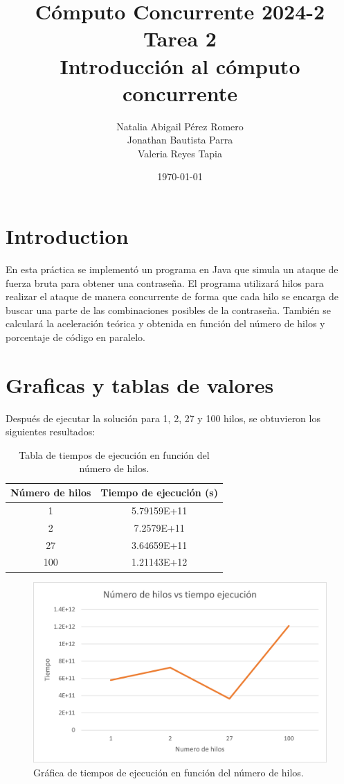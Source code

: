 \documentclass{article}
\title{Cómputo Concurrente 2024-2 \\ Tarea 2 \\ Introducción al cómputo concurrente}
\author{Natalia Abigail Pérez Romero\\
Jonathan Bautista Parra \\ Valeria Reyes Tapia}
\date{\today}
\begin{document}
\maketitle
\section{Introduction}
En esta práctica se implementó un programa en Java que simula un ataque de fuerza bruta para obtener una contraseña. El programa utilizará hilos para realizar el ataque de manera concurrente de forma que cada hilo se encarga de buscar una parte de las combinaciones posibles de la contraseña. También se calculará la aceleración teórica y obtenida en función del número de hilos y porcentaje de código en paralelo.

\section{Graficas y tablas de valores}

Después de ejecutar la solución para 1, 2, 27 y 100 hilos, se obtuvieron los siguientes resultados:

\begin{table}[h]
    \centering
        \begin{tabular}{|c|c|}
            \hline
            \textbf{Número de hilos} & \textbf{Tiempo de ejecución (s)} \\
            \hline
            1 & 5.79159E+11\\
            \hline  
            2 &  7.2579E+11 \\
            \hline
            27 &  3.64659E+11\\
            \hline
            100 &  1.21143E+12\\
            \hline
        \end{tabular}
    \caption{Tabla de tiempos de ejecución en función del número de hilos.}
    \label{tab:tiempos-ejecucion}
\end{table}

\begin{figure}
    \centering
    \includegraphics[width=\textwidth]{diagramaTiempoVSHilos.png}
    \caption{Gráfica de tiempos de ejecución en función del número de hilos.}
    \label{fig:tiempos-ejecucion}
\end{figure}
\end{document}
